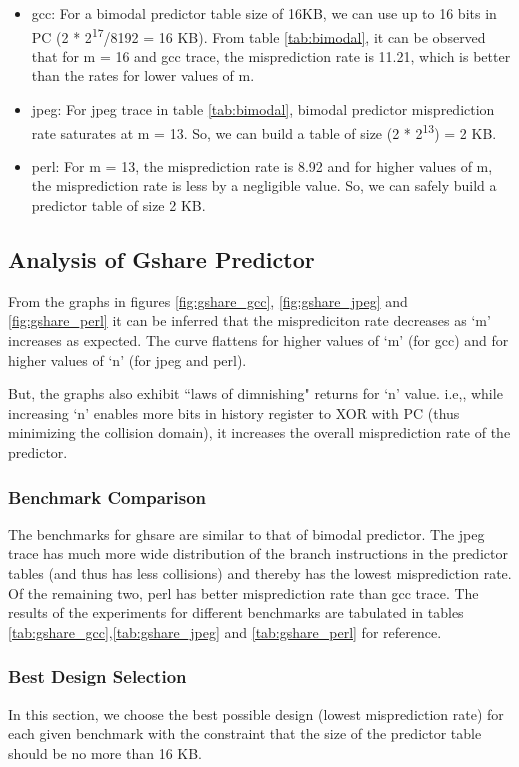 \begin{itemize}
\item gcc: For a bimodal predictor table size of 16KB, we can use up to 16 bits in PC (2 * 2\textsuperscript{17}/8192 = 16 KB). From table \ref{tab:bimodal}, it can be observed that for m = 16 and gcc trace, the misprediction rate is 11.21, which is better than the rates for lower values of m.

\item jpeg: For jpeg trace in table \ref{tab:bimodal}, bimodal predictor misprediction rate saturates at m = 13. So, we can build a table of size (2 * 2\textsuperscript{13}) = 2 KB.

\item perl: For m = 13, the misprediction rate is 8.92 and for higher values of m, the misprediction rate is less by a negligible value. So, we can safely build a predictor table of size 2 KB.
\end{itemize}

\subsection{Analysis of Gshare Predictor}
From the graphs in figures \ref{fig:gshare_gcc}, \ref{fig:gshare_jpeg} and \ref{fig:gshare_perl} it can be inferred that the misprediciton rate decreases as `m' increases as expected. The curve flattens for higher values of `m' (for gcc) and for higher values of `n' (for jpeg and perl).

But, the graphs also exhibit ``laws of dimnishing" returns for `n' value. i.e,, while increasing `n' enables more bits in history register to XOR with PC (thus minimizing the collision domain), it increases the overall misprediction rate of the predictor. 

\subsubsection{Benchmark Comparison}
The benchmarks for ghsare are similar to that of bimodal predictor. The jpeg trace has much more wide distribution of the branch instructions in the predictor tables (and thus has less collisions) and thereby has the lowest misprediction rate. Of the remaining two, perl has better misprediction rate than gcc trace. The results of the experiments for different benchmarks are tabulated in tables \ref{tab:gshare_gcc},\ref{tab:gshare_jpeg} and \ref{tab:gshare_perl} for reference. 

\subsubsection{Best Design Selection}
In this section, we choose the best possible design (lowest misprediction rate) for each given benchmark with the constraint that the size of the predictor table should be no more than 16 KB.

